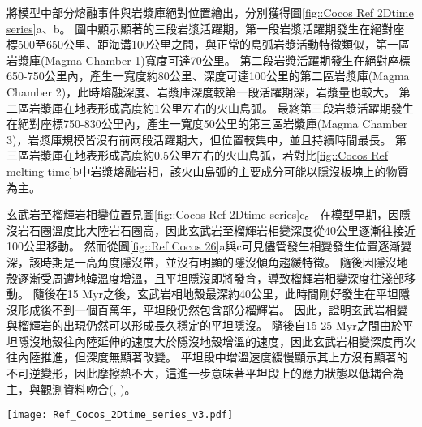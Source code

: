 將模型中部分熔融事件與岩漿庫絕對位置繪出，分別獲得圖\ref{fig::Cocos Ref 2Dtime series}a、b。
圖中顯示顯著的三段岩漿活躍期，第一段岩漿活躍期發生在絕對座標500至650公里、距海溝100公里之間，與正常的島弧岩漿活動特徵類似，第一區岩漿庫(Magma Chamber 1)寬度可達70公里。
第二段岩漿活躍期發生在絕對座標650-750公里內，產生一寬度約80公里、深度可達100公里的第二區岩漿庫(Magma Chamber 2)，此時熔融深度、岩漿庫深度較第一段活躍期深，岩漿量也較大。
第二區岩漿庫在地表形成高度約1公里左右的火山島弧。
最終第三段岩漿活躍期發生在絕對座標750-830公里內，產生一寬度50公里的第三區岩漿庫(Magma Chamber 3)，岩漿庫規模皆沒有前兩段活躍期大，但位置較集中，並且持續時間最長。
第三區岩漿庫在地表形成高度約0.5公里左右的火山島弧，若對比\ref{fig::Cocos Ref melting time}b中岩漿熔融岩相，該火山島弧的主要成分可能以隱沒板塊上的物質為主。

玄武岩至榴輝岩相變位置見圖\ref{fig::Cocos Ref 2Dtime series}c。
在模型早期，因隱沒岩石圈溫度比大陸岩石圈高，因此玄武岩至榴輝岩相變深度從40公里逐漸往接近100公里移動。
然而從圖\ref{fig::Ref Cocos 26}a與c可見儘管發生相變發生位置逐漸變深，該時期是一高角度隱沒帶，並沒有明顯的隱沒傾角趨緩特徵。
隨後因隱沒地殼逐漸受周遭地韓溫度增溫，且平坦隱沒即將發育，導致榴輝岩相變深度往淺部移動。
隨後在15 Myr之後，玄武岩相地殼最深約40公里，此時間剛好發生在平坦隱沒形成後不到一個百萬年，平坦段仍然包含部分榴輝岩。
因此，證明玄武岩相變與榴輝岩的出現仍然可以形成長久穩定的平坦隱沒。
隨後自15-25 Myr之間由於平坦隱沒地殼往內陸延伸的速度大於隱沒地殼增溫的速度，因此玄武岩相變深度再次往內陸推進，但深度無顯著改變。
平坦段中增溫速度緩慢顯示其上方沒有顯著的不可逆變形，因此摩擦熱不大，這進一步意味著平坦段上的應力狀態以低耦合為主，與觀測資料吻合(\citealp{moran2007cenozoic}, \citealp{PerezCampos2008})。

\begin{figure*}[ht]
    \centering
    \texttt{[image: Ref\_Cocos\_2Dtime\_series\_v3.pdf]}
    \caption[墨西哥參考模型部分熔融、岩漿庫與玄武岩相變時空關係圖]{墨西哥參考模型部分熔融、岩漿庫與玄武岩相變位置時空關係圖。(a)圓點為墨西哥參考模型於時間軸上部分熔融發生位置，圓點顏色代表時間，僅包含網格中熔融比例大於千分之一的網格。線條為每10 Myr的隱沒板塊頂部介面，分別為10 Myr、20Myr、30 Myr與40 Myr，橫軸上方標示出模型於40 Myr的相對海溝距離。(b)圓點為墨西哥參考模型於時間軸上岩漿庫發生位置，圓點顏色代表時間，僅繪出網格中岩漿比例大於千分之一的網格。線條為每10 Myr的隱沒板塊頂部介面，分別為10 Myr、20Myr、30 Myr與40 Myr，橫軸上方標示出模型於40 Myr的相對海溝距離。粉紅細線標示出三個岩漿庫，並分別在橘色方框中標出文中說明的岩漿庫名稱。(c)圓點為墨西哥參考模型於時間軸上之玄武岩相變位置變化圖，圓點顏色代表時間。}
    \label{fig::Cocos Ref 2Dtime series}
\end{figure*}


